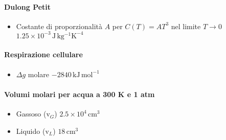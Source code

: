 \documentclass[10pt, oneside]{article}
\begin{document}
\paragraph{Dulong Petit}
\begin{itemize}
\item Costante di proporzionalità $A$ per $C(T) = A T^3$ nel limite $T \rightarrow 0$ \dotfill $ 1.25 \times 10^{-3} \, \mathrm{J \, kg^{-1} K^{-4}}$ 
\end{itemize}
\paragraph{Respirazione cellulare}
\begin{itemize}
\item $\Delta g$ molare \dotfill $ -2840 \, \mathrm{kJ \, mol^{-1}}$
\end{itemize}
\paragraph{Volumi molari per acqua a 300 K e 1 atm}
\begin{itemize}
\item Gassoso ($\mathrm{v}_G$) \dotfill $ 2.5 \times 10^{4} \, \mathrm{cm^{3}}$
\item Liquido ($\mathrm{v}_L$) \dotfill $ 18 \, \mathrm{cm^{3}}$
\end{itemize}
\end{document}
